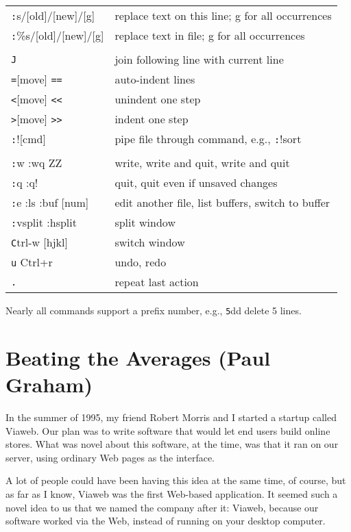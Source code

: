 \documentclass[10pt,twoside,openright]{memoir}
\begin{document}
{\begin{tabular}{ll}
{\texttt :s/[old]/[new]/[g]} & replace text on this line; g for all occurrences \\
{\texttt :\%s/[old]/[new]/[g]} & replace text in file; g for all occurrences \\
& \\
{\texttt J} & join following line with current line \\
{\texttt =[move] \verb|==|} & auto-indent lines \\
{\texttt <[move] \verb|<<|} & unindent one step \\
{\texttt >[move] \verb|>>|} & indent one step \\
{\texttt :![cmd]} & pipe file through command, e.g., {\texttt :!sort} \\
& \\
{\texttt :w :wq ZZ} & write, write and quit, write and quit \\
{\texttt :q :q!} & quit, quit even if unsaved changes \\
{\texttt :e :ls :buf [num]} & edit another file, list buffers, switch to buffer \\
{\texttt :vsplit :hsplit} & split window \\
{\texttt Ctrl-w [hjkl]} & switch window \\
{\texttt u Ctrl+r} & undo, redo \\
{\texttt .} & repeat last action \\
\end{tabular}

\vskip 0.1in
\noindent
Nearly all commands support a prefix number, e.g., {\texttt 5dd} delete 5 lines.
}

\chapter{Beating the Averages (Paul Graham)}

In the summer of 1995, my friend Robert Morris and I started a startup called Viaweb. Our plan was to write software that would let end users build online stores. What was novel about this software, at the time, was that it ran on our server, using ordinary Web pages as the interface.

A lot of people could have been having this idea at the same time, of course, but as far as I know, Viaweb was the first Web-based application. It seemed such a novel idea to us that we named the company after it: Viaweb, because our software worked via the Web, instead of running on your desktop computer.
\end{document}
